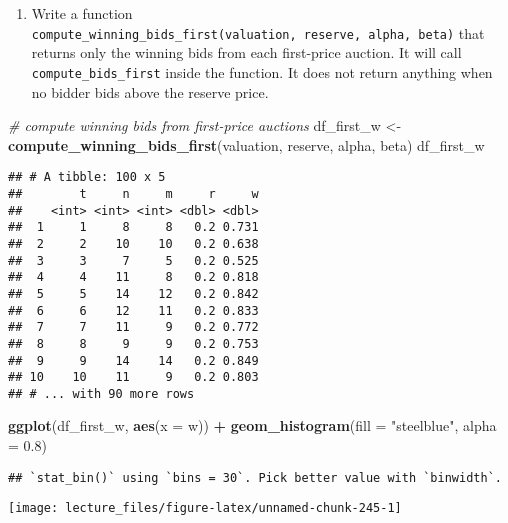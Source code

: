 \documentclass[
]{book}
\newenvironment{Shaded}{\begin{snugshade}}{\end{snugshade}}
\newcommand{\CommentTok}[1]{\textcolor[rgb]{0.56,0.35,0.01}{\textit{#1}}}
\newcommand{\DataTypeTok}[1]{\textcolor[rgb]{0.13,0.29,0.53}{#1}}
\newcommand{\FloatTok}[1]{\textcolor[rgb]{0.00,0.00,0.81}{#1}}
\newcommand{\KeywordTok}[1]{\textcolor[rgb]{0.13,0.29,0.53}{\textbf{#1}}}
\newcommand{\NormalTok}[1]{#1}
\newcommand{\OperatorTok}[1]{\textcolor[rgb]{0.81,0.36,0.00}{\textbf{#1}}}
\newcommand{\StringTok}[1]{\textcolor[rgb]{0.31,0.60,0.02}{#1}}
\providecommand{\tightlist}{%
  \setlength{\itemsep}{0pt}\setlength{\parskip}{0pt}}
\begin{document}
\begin{enumerate}
\def\labelenumi{\arabic{enumi}.}
\setcounter{enumi}{5}
\tightlist
\item
  Write a function \texttt{compute\_winning\_bids\_first(valuation,\ reserve,\ alpha,\ beta)} that returns only the winning bids from each first-price auction. It will call \texttt{compute\_bids\_first} inside the function. It does not return anything when no bidder bids above the reserve price.
\end{enumerate}

\begin{Shaded}
\begin{Highlighting}[]
\CommentTok{# compute winning bids from first-price auctions}
\NormalTok{df_first_w <-}
\StringTok{  }\KeywordTok{compute_winning_bids_first}\NormalTok{(valuation, reserve, alpha, beta)}
\NormalTok{df_first_w}
\end{Highlighting}
\end{Shaded}

\begin{verbatim}
## # A tibble: 100 x 5
##        t     n     m     r     w
##    <int> <int> <int> <dbl> <dbl>
##  1     1     8     8   0.2 0.731
##  2     2    10    10   0.2 0.638
##  3     3     7     5   0.2 0.525
##  4     4    11     8   0.2 0.818
##  5     5    14    12   0.2 0.842
##  6     6    12    11   0.2 0.833
##  7     7    11     9   0.2 0.772
##  8     8     9     9   0.2 0.753
##  9     9    14    14   0.2 0.849
## 10    10    11     9   0.2 0.803
## # ... with 90 more rows
\end{verbatim}

\begin{Shaded}
\begin{Highlighting}[]
\KeywordTok{ggplot}\NormalTok{(df_first_w, }\KeywordTok{aes}\NormalTok{(}\DataTypeTok{x =}\NormalTok{ w)) }\OperatorTok{+}\StringTok{ }\KeywordTok{geom_histogram}\NormalTok{(}\DataTypeTok{fill =} \StringTok{"steelblue"}\NormalTok{, }\DataTypeTok{alpha =} \FloatTok{0.8}\NormalTok{)}
\end{Highlighting}
\end{Shaded}

\begin{verbatim}
## `stat_bin()` using `bins = 30`. Pick better value with `binwidth`.
\end{verbatim}

\begin{center}\texttt{[image: lecture\_files/figure-latex/unnamed-chunk-245-1]} \end{center}
\end{document}
